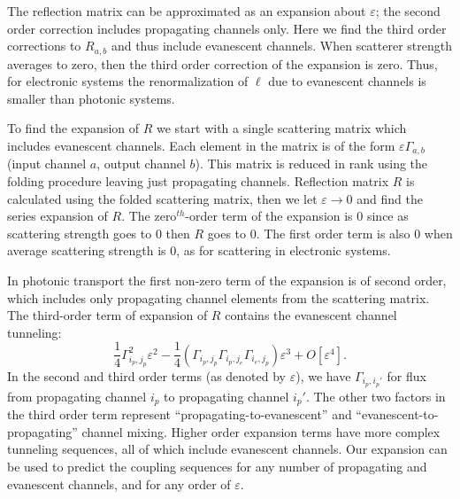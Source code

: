 
The reflection matrix can be approximated as an expansion about $\varepsilon$; the second order correction includes propagating channels only. Here we find the third order corrections to $R_{a,b}$ and thus include evanescent channels. When scatterer strength averages to zero, then the third order correction of the expansion is zero. Thus, for electronic systems the renormalization of $\ell$ due to evanescent channels is smaller than photonic systems.

To find the expansion of $R$ we start with a single scattering matrix which includes evanescent channels. Each element in the matrix is of the form $\varepsilon \Gamma_{a,b}$ (input channel $a$, output channel $b$). This matrix is reduced in rank using the folding procedure leaving just propagating channels. Reflection matrix $R$ is calculated using the folded scattering matrix, then we let $\varepsilon \rightarrow 0$ and find the series expansion of $R$. The zero$^{th}$-order term of the expansion is 0 since as scattering strength goes to 0 then $R$ goes to 0. The first order term is also 0 when average scattering strength is 0, as for scattering in electronic systems. 

In photonic transport the first non-zero term of the expansion is of second order, which includes only propagating channel elements from the scattering matrix. The third-order term of expansion of $R$ contains the evanescent channel tunneling:
\begin{equation}
\frac{1}{4} \Gamma_{i_p,j_p}^2 \varepsilon ^2-\frac{1}{4} \left(\Gamma_{i_p,j_p} \Gamma_{i_p,j_e} \Gamma_{i_e,j_p}\right) \varepsilon ^3+O[\varepsilon^4 ].
\label{eq:expansion_of_R}
\end{equation}
In the second and third order terms (as denoted by $\varepsilon$), we have $\Gamma_{i_p,i_p'}$ for flux from propagating channel $i_p$ to propagating channel $i_p'$. The other two factors in the third order term represent ``propagating-to-evanescent'' and ``evanescent-to-propagating'' channel mixing. Higher order expansion terms have more complex tunneling sequences, all of which include evanescent channels. Our expansion can be used to predict the coupling sequences for any number of propagating and evanescent channels, and for any order of $\varepsilon$. 

